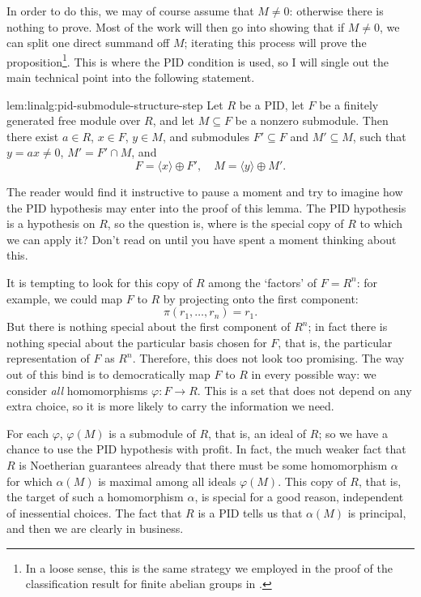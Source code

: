 In order to do this, we may of course assume that $M \neq 0$:
otherwise there is nothing to prove. Most of the work will then go
into showing that if $M \neq 0$, we can split one direct summand off
$M$; iterating this process will prove the proposition\footnote{In a
  loose sense, this is the same strategy we employed in the proof of
  the classification result for finite abelian groups in
  .}. This is where the PID
condition is used, so I will single out the main technical point into
the following statement.
\begin{lem}{}{lem:linalg:pid-submodule-structure-step}
  Let $R$ be a PID, let $F$ be a finitely generated free module over
  $R$, and let $M \subseteq F$ be a nonzero submodule. Then there
  exist $a \in R$, $x \in F$, $y \in M$, and submodules
  $F' \subseteq F$ and $M' \subseteq M$, such that $y = ax \neq 0$,
  $M' = F' \cap M$, and
  \[
    F = \langle x \rangle \oplus F', \quad M = \langle y \rangle
    \oplus M'.
  \]
\end{lem}
The reader would find it instructive to pause a moment and try to
imagine how the PID hypothesis may enter into the proof of this lemma.
The PID hypothesis is a hypothesis on $R$, so the question is, where
is the special copy of $R$ to which we can apply it? Don't read on
until you have spent a moment thinking about this.

It is tempting to look for this copy of $R$ among the `factors' of
$F = R^n$: for example, we could map $F$ to $R$ by projecting onto the
first component:
\[
  \pi(r_1, \dots, r_n) = r_1.
\]
But there is nothing special about the first component of $R^n$; in
fact there is nothing special about the particular basis chosen for
$F$, that is, the particular representation of $F$ as
$R^n$. Therefore, this does not look too promising. The way out of
this bind is to democratically map $F$ to $R$ in every possible way:
we consider \emph{all} homomorphisms $\varphi : F \to R$. This is a
set that does not depend on any extra choice, so it is more likely to
carry the information we need.

For each $\varphi$, $\varphi(M)$ is a submodule of $R$, that is, an
ideal of $R$; so we have a chance to use the PID hypothesis with
profit. In fact, the much weaker fact that $R$ is Noetherian
guarantees already that there must be some homomorphism $\alpha$ for
which $\alpha(M)$ is maximal among all ideals $\varphi(M)$. This copy
of $R$, that is, the target of such a homomorphism $\alpha$, is
special for a good reason, independent of inessential choices. The
fact that $R$ is a PID tells us that $\alpha(M)$ is principal, and
then we are clearly in business.

